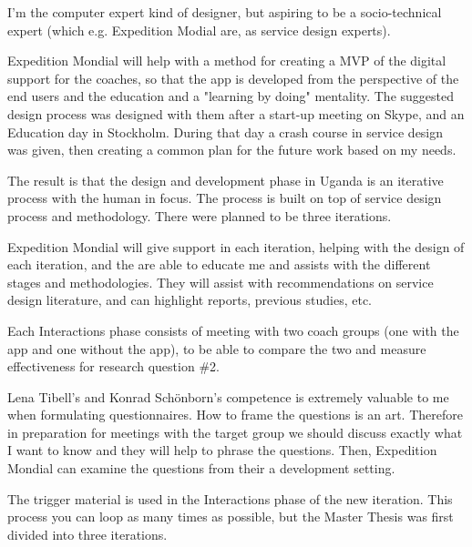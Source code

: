 

I'm the computer expert kind of designer, but aspiring to be a socio-technical expert (which e.g. Expedition Modial are, as service design experts).

Expedition Mondial will help with a method for creating a MVP of the digital support for the coaches, so that the app is developed from the perspective of the end users and the education and a "learning by doing" mentality. The suggested design process was designed with them after a start-up meeting on Skype, and an Education day in Stockholm. During that day a crash course in service design was given, then creating a common plan for the future work based on my needs.

The result is that the design and development phase in Uganda is an iterative process with the human in focus. The process is built on top of service design process and methodology. There were planned to be three iterations.

Expedition Mondial will give support in each iteration, helping with the design of each iteration, and the are able to educate me and assists with the different stages and methodologies. They will assist with recommendations on service design literature, and can highlight reports, previous studies, etc.

Each Interactions phase consists of meeting with two coach groups (one with the app and one without the app), to be able to compare the two and measure effectiveness for research question \#2.

Lena Tibell's and Konrad Schönborn's  competence is extremely valuable to me when formulating questionnaires. How to frame the questions is an art.  Therefore in preparation for meetings with the target group we should discuss exactly what I want to know and they will help to phrase the questions. Then, Expedition Mondial can examine the questions from their a development setting.

The trigger material is used in the Interactions phase of the new iteration. This process you can loop as many times as possible, but the Master Thesis was first divided into three iterations.

